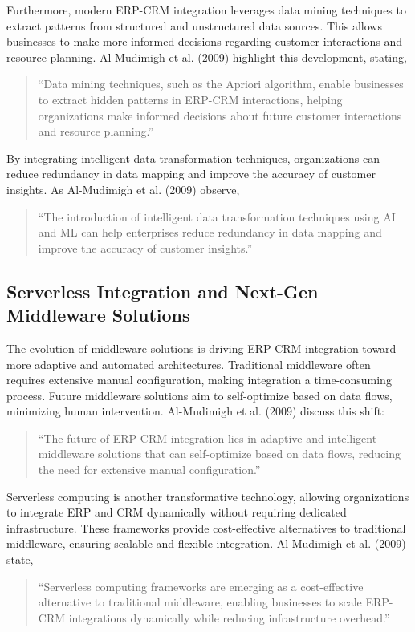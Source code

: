 Furthermore, modern ERP-CRM integration leverages data mining techniques to extract patterns from structured and unstructured data sources. This allows businesses to make more informed decisions regarding customer interactions and resource planning. Al-Mudimigh et al. (2009) highlight this development, stating, 
\begin{quote}
    ``Data mining techniques, such as the Apriori algorithm, enable businesses to extract hidden patterns in ERP-CRM interactions, helping organizations make informed decisions about future customer interactions and resource planning.'' \cite{almudimigh2009}
\end{quote}

By integrating intelligent data transformation techniques, organizations can reduce redundancy in data mapping and improve the accuracy of customer insights. As Al-Mudimigh et al. (2009) observe, 
\begin{quote}
    ``The introduction of intelligent data transformation techniques using AI and ML can help enterprises reduce redundancy in data mapping and improve the accuracy of customer insights.'' \cite{almudimigh2009}
\end{quote}

\subsection{Serverless Integration and Next-Gen Middleware Solutions}

The evolution of middleware solutions is driving ERP-CRM integration toward more adaptive and automated architectures. Traditional middleware often requires extensive manual configuration, making integration a time-consuming process. Future middleware solutions aim to self-optimize based on data flows, minimizing human intervention. Al-Mudimigh et al. (2009) discuss this shift:
\begin{quote}
    ``The future of ERP-CRM integration lies in adaptive and intelligent middleware solutions that can self-optimize based on data flows, reducing the need for extensive manual configuration.'' \cite{almudimigh2009}
\end{quote}

Serverless computing is another transformative technology, allowing organizations to integrate ERP and CRM dynamically without requiring dedicated infrastructure. These frameworks provide cost-effective alternatives to traditional middleware, ensuring scalable and flexible integration. Al-Mudimigh et al. (2009) state, 
\begin{quote}
    ``Serverless computing frameworks are emerging as a cost-effective alternative to traditional middleware, enabling businesses to scale ERP-CRM integrations dynamically while reducing infrastructure overhead.'' \cite{almudimigh2009}
\end{quote}

